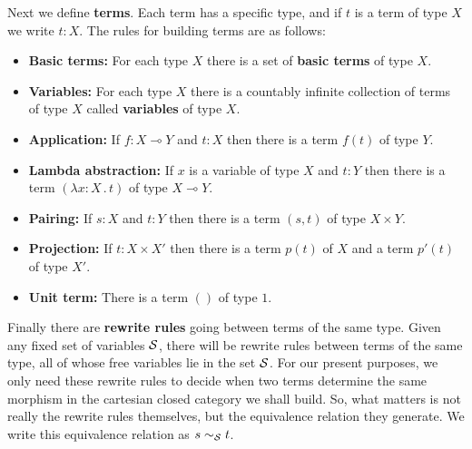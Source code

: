 \documentclass[12pt]{article}
\newcommand{\lhom}{\multimap}
\begin{document}
Next we define {\bf terms}.  Each term has a specific type, and if $t$
is a term of type $X$ we write $t\!:\!X$.  The rules for building terms
are as follows:
\begin{itemize}
  \item {\bf Basic terms:} For each type $X$ there is a set of
{\bf basic terms} of type $X$.
  \item {\bf Variables:} For each type $X$ there is a countably 
infinite collection of terms of type $X$ called {\bf variables}
of type $X$.
  \item {\bf Application:} 
If $f:X \lhom Y$ and $t:X$ then there is a term $f(t)$ of type
$Y$.
  \item {\bf Lambda abstraction:} 
If $x$ is a variable of type $X$ and $t:Y$ 
then there is a term $(\lambda x\! : \!X \, .\, t)$ of type $X \lhom Y$.
  \item {\bf Pairing:} If $s:X$ and $t:Y$ then there is a term $(s,t)$ of
type $X \times Y$.
  \item {\bf Projection:}
If $t:X \times X'$ then there is a term $p(t)$ of $X$ and a term
$p'(t)$ of type $X'$.
  \item {\bf Unit term:} There is a term $()$ of type $1$.
\end{itemize}

Finally there are {\bf rewrite rules} going between terms of the same
type.  Given any fixed set of variables ${\cal S}$, there will be
rewrite rules between terms of the same type, all of whose free
variables lie in the set ${\cal S}$.  For our present purposes, we
only need these rewrite rules to decide when two terms determine the
same morphism in the cartesian closed category we shall build.  So,
what matters is not really the rewrite rules themselves, but the
equivalence relation they generate.  We write this equivalence
relation as $s {\; {\sim}_{\cal S} \; } t$.
\end{document}
